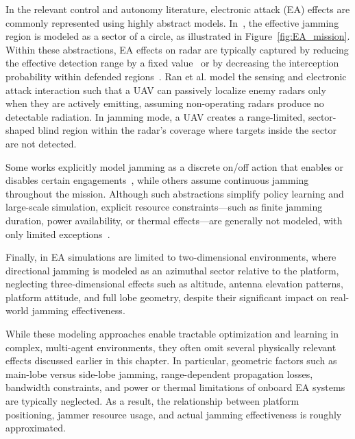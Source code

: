 In the relevant control and autonomy literature, electronic attack (EA) effects are commonly represented using highly abstract models. In~\cite{xu2025mdrl_uav_combat, yue2022uav_sead_hmarl}, the effective jamming region is modeled as a sector of a circle, as illustrated in Figure~\ref{fig:EA_mission}. Within these abstractions, EA effects on radar are typically captured by reducing the effective detection range by a fixed value~\cite{yue2022uav_sead_hmarl, Lee2023MUMTSEAD} or by decreasing the interception probability within defended regions~\cite{Fang2021CollaborativeCombat, cognitive_jammer_vs_radar_2025}. Ran et al. \cite{Ran2023UAVIPPO} model the sensing and electronic attack interaction such that a UAV can passively localize enemy radars only when they are actively emitting, assuming non-operating radars produce no detectable radiation. In jamming mode, a UAV creates a range-limited, sector-shaped blind region within the radar’s coverage where targets inside the sector are not detected.

Some works explicitly model jamming as a discrete on/off action that enables or disables certain engagements~\cite{Lee2023MUMTSEAD, xu2025mdrl_uav_combat, Ran2023UAVIPPO}, while others assume continuous jamming throughout the mission. Although such abstractions simplify policy learning and large-scale simulation, explicit resource constraints—such as finite jamming duration, power availability, or thermal effects—are generally not modeled, with only limited exceptions~\cite{xu2025mdrl_uav_combat}.

Finally, in \cite{Lee2023MUMTSEAD, xu2025mdrl_uav_combat, yue2022uav_sead_hmarl} EA simulations are limited to two-dimensional environments, where directional jamming is modeled as an azimuthal sector relative to the platform, neglecting three-dimensional effects such as altitude, antenna elevation patterns, platform attitude, and full lobe geometry, despite their significant impact on real-world jamming effectiveness.

While these modeling approaches enable tractable optimization and learning in complex, multi-agent environments, they often omit several physically relevant effects discussed earlier in this chapter. In particular, geometric factors such as main-lobe versus side-lobe jamming, range-dependent propagation losses, bandwidth constraints, and power or thermal limitations of onboard EA systems are typically neglected. As a result, the relationship between platform positioning, jammer resource usage, and actual jamming effectiveness is roughly approximated.


